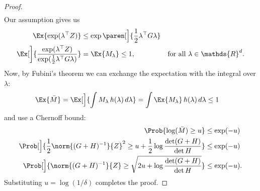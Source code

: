 \documentclass{article}
\newcommand{\inv}[1]{#1^{-1}}
\newcommand{\Real}{\mathds{R}}
\DeclarePairedDelimiter{\paren}()
\providecommand\transp{\top}
\let\transpsymbol\transp
\renewcommand{\transp}[1]{#1^\transpsymbol}
\begin{document}
\begin{lemma}
\begin{proof}
\begin{align*}
    \end{align*}
    Our assumption gives us
    \begin{align*}
      \Ex{\exp(\transp{\lambda}Z)} &\le \exp\paren[\Big]{\frac{1}{2}\transp{\lambda}G\lambda} \\
      \Ex[\bigg]{\frac{\exp(\transp{\lambda}Z)}{\exp(\frac{1}{2}\transp{\lambda}G\lambda)}}
      &= \Ex{M_\lambda} \le 1, &\text{for all }\lambda\in\Real^d.
    \end{align*}
    Now, by Fubini's theorem we can exchange the expectation with the
    integral over $\lambda$:
    \begin{align*}
      \Ex{\bar{M}} &= \Ex[\Big]{\int M_\lambda\,h(\lambda)\,d\lambda} = \int \Ex{M_\lambda} \,h(\lambda)\,d\lambda \le 1
    \end{align*}
    and use a Chernoff bound:
    \begin{align*}
      \Prob{\log(\bar{M}) \ge u} &\le \exp(-u) \\
      \Prob[\Big]{\frac{1}{2}\norm{\inv{(G+H)}}{Z}^2 \ge u + \frac{1}{2}\log\frac{\det(G+H)}{\det H}} &\le \exp(-u) \\
      \Prob[\Big]{\norm{\inv{(G+H)}}{Z} \ge \sqrt{2u + \log\frac{\det(G+H)}{\det H}}} &\le \exp(-u).
    \end{align*}
    Substituting $u = \log(1/\delta)$ completes the proof.
  \end{proof}

\end{lemma}

\end{document}
